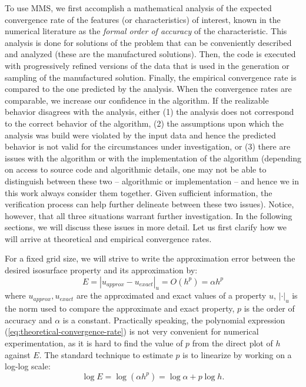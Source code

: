 To use MMS, we first accomplish a mathematical analysis of
the expected convergence rate of the features (or characteristics) of interest, 
known in the numerical literature as the \emph{formal order of accuracy} of the
characteristic. This analysis is done for solutions of the problem that can
be conveniently described and analyzed (these are the manufactured
solutions). Then, the code is executed with progressively refined
versions of the data that is used in the generation or sampling of 
the manufactured solution. Finally, the empirical convergence rate is compared to the
one predicted by the analysis.  When the convergence rates are
comparable, we increase our confidence in the algorithm.
%
If the realizable behavior disagrees with the analysis, either (1) the analysis 
does not correspond to the correct behavior of the algorithm, (2) the assumptions
upon which the analysis was build were violated by the input data and hence
the predicted behavior is not valid for the circumstances under investigation, or (3) 
there are issues with the algorithm or with the implementation of the 
algorithm (depending on access to source code
and algorithmic details, one may not be able to distinguish between
these two -- algorithmic or implementation -- and hence we in this work 
always consider them together. Given sufficient information, the
verification process can help further delineate between these
two issues). Notice, however, that all three situations
warrant further investigation. In the following sections, we will discuss
these issues in more detail.  Let us first clarify how
we will arrive at theoretical and empirical convergence rates.

For a fixed grid size, we will strive to write the approximation error
between the desired isosurface property and its approximation by:
\begin{equation}
E = |u_{approx} - u_{exact}|_u = O(h^p) = \alpha h^p
\label{eq:theoretical-convergence-rate}
\end{equation}
\noindent where $u_{approx},u_{exact}$ are the approximated and 
exact values of a property $u$,  
$|\cdot|_u$ is the norm used to compare the approximate and exact property,
$p$ is the order of accuracy and $\alpha$ is a constant. 
Practically speaking, the polynomial expression
(\ref{eq:theoretical-convergence-rate}) is not very convenient for numerical 
experimentation, as 
it is hard to find the value of $p$ from the direct plot of $h$ against $E$.
The standard technique to estimate $p$ is to linearize by
working on a log-log scale:
\begin{equation}
 \log E = \log (\alpha  h^p) = \log \alpha  + p \log h.
\label{eq:error-log-evaluation}
\end{equation}

